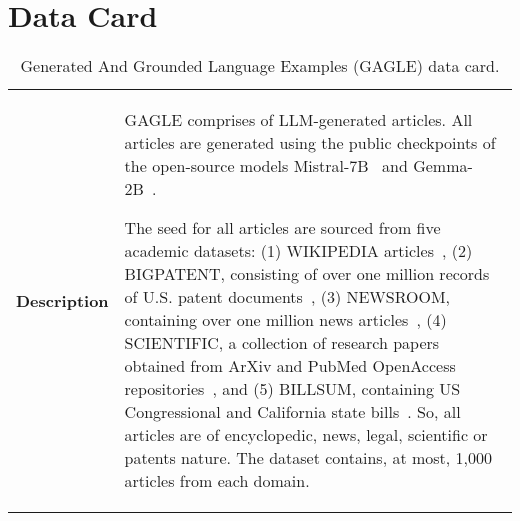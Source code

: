 \section{Data Card}\label{sect:app:data_card}
\begin{table}[H]
    \centering\footnotesize
    \caption{Generated And Grounded Language Examples (GAGLE) data card.
    }
    \label{tab:context:appendix}
\begin{tabularx}{\linewidth}{l|X}
  \toprule
  \bf Description &  GAGLE comprises of LLM-generated articles. All articles are generated using the public checkpoints of the open-source models Mistral-7B~\citep{jiang2023mistral7b} and Gemma-2B~\citep{gemmateam2024gemmaopenmodelsbased}. 
  
  The seed for all articles are sourced from five academic datasets: (1) WIKIPEDIA articles~\citep{wikidump}, (2) BIGPATENT, consisting of over one million records of U.S. patent documents~\citep{sharma2019bigpatent}, (3) NEWSROOM, containing over one million news articles~\citep{Grusky_2018}, (4) SCIENTIFIC, a collection of research papers obtained from ArXiv and PubMed OpenAccess repositories~\citep{Cohan_2018}, and (5) BILLSUM, containing US Congressional and California state bills~\citep{kornilova2019billsum}. So, all articles are of encyclopedic, news, legal, scientific or patents nature.  The dataset contains, at most, 1,000 articles from each domain.
  

\end{tabularx}
\end{table}
